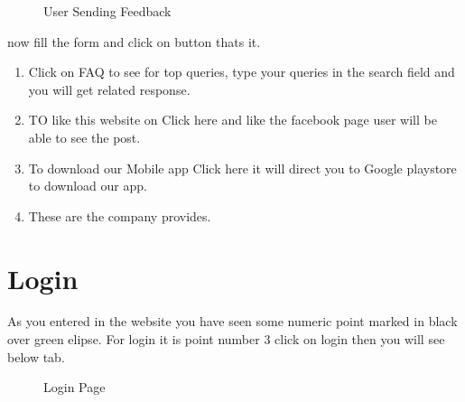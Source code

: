 \documentclass[a4paper,10pt,english]{report}
\begin{document}
\begin{figure}[htbp]
\centering
\capstart

\noindent{}
\caption{User Sending Feedback}\label{\detokenize{index:id21}}\label{\detokenize{index:id11}}\end{figure}

now fill the form and click on  button thats it.
\begin{enumerate}
\def\theenumi{\arabic{enumi}}
\def\labelenumi{\theenumi .}
\makeatletter\def\p@enumii{\p@enumi \theenumi .}\makeatother
\setcounter{enumi}{13}
\item {} 
Click on FAQ to see for top queries, type your queries in the search field and you will get related response.

\item {} 
TO like this website on  Click here and like the facebook page user will be able to see the post.

\item {} 
To download our Mobile app Click here it will direct you to  Google playstore to download our app.

\item {} 
These are the  company provides.

\end{enumerate}


\section{Login}
\label{\detokenize{login:login}}\label{\detokenize{login::doc}}
As you entered in the website you have seen some numeric point marked in black over green elipse. For login it is point number 3 click on login then you will see below tab.

\begin{figure}[htbp]
\centering
\capstart

\noindent{}
\caption{Login Page}\label{\detokenize{login:id2}}\label{\detokenize{login:id1}}\end{figure}
\end{document}
